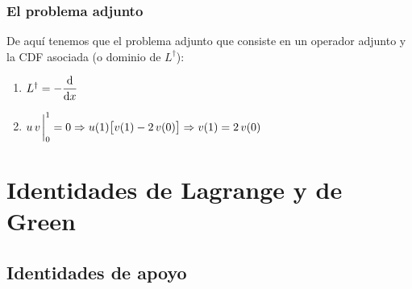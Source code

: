 \documentclass[12pt]{beamer}
\begin{document}
\begin{frame}
\frametitle{El problema adjunto}
De aquí tenemos que el problema adjunto que consiste en un operador adjunto y la CDF asociada (o dominio de $L^{\dagger}$):
\pause
{}
\begin{enumerate}[<+->]
\item $L^{\dagger} = - \displaystyle \dv{x}$
\item $\displaystyle u \, v \eval_{0}^{1} = 0 \Rightarrow u (1) \big[ v(1) - 2 \, v(0) \big] \Rightarrow v (1) = 2 \, v(0)$
\end{enumerate}
\end{frame}


\section{Identidades de Lagrange y de Green}
\subsection{Identidades de apoyo}
\end{document}

